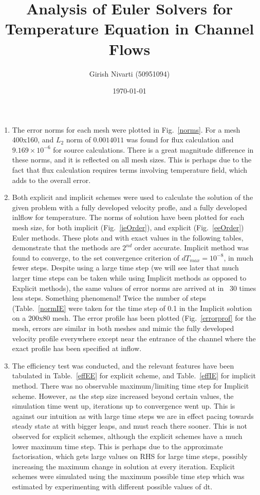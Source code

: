 \documentclass[a4paper,10pt]{article}
\title{Analysis of Euler Solvers for Temperature Equation in Channel Flows}
\author{Girish Nivarti (50951094)}
\date{\today}
\begin{document}
\maketitle

\begin{enumerate}[I]
\item The error norms for each mesh were plotted in Fig.~\ref{norms}. For a mesh 400x160, and $L_2$ norm of $0.0014011$ was found for flux calculation and $9.169\times10^{-6}$ for source calculations. There is a great magnitude difference in these norms, and it is reflected on all mesh sizes. This is perhaps due to the fact that flux calculation requires terms involving temperature field, which adds to the overall error.

\item Both explicit and implicit schemes were used to calculate the solution of the given problem with a fully developed velocity profle, and a fully developed inlflow for temperature. The norms of solution have been plotted for each mesh size, for both implicit (Fig.~\ref{ieOrder}), and explicit (Fig.~\ref{eeOrder}) Euler methods. These plots and with exact values in the following tables, demonstrate that the methods are $2^{nd}$ order accurate. Implicit method was found to converge, to the set convergence criterion of $dT_{max} = 10^{-8}$, in much fewer steps. Despite using a large time step (we will see later that much larger time steps can be taken while using Implicit methods as opposed to Explicit methods), the same values of error norms are arrived at in ~30 times less steps. Something phenomenal! Twice the number of steps (Table.~\ref{normIE} were taken for the time step of 0.1 in the Implicit solution on a 200x80 mesh. The error profile has been plotted (Fig.~\ref{errorprof} for the mesh, errors are similar in both meshes and mimic the fully developed velocity profile everywhere except near the entrance of the channel where the exact profile has been specified at inflow.

\item The efficiency test was conducted, and the relevant features have been tabulated in Table.~\ref{effEE} for explicit scheme, and Table.~\ref{effIE} for implicit method. There was no observable maximum/limiting time step for Implicit scheme. However, as the step size increased beyond certain values, the simulation time went up, iterations up to convergence went up. This is against our intuition as with large time steps we are in effect pacing towards steady state at with bigger leaps, and must reach there sooner. This is not observed for explicit schemes, although the explicit schemes have a much lower maximum time step. This is perhaps due to the approximate factorisation, which gets large values on RHS for large time steps, possibly increasing the maximum change in solution at every iteration. Explicit schemes were simulated using the maximum possible time step which was estimated by experimenting with different possible values of dt.


\end{enumerate}
\end{document}
